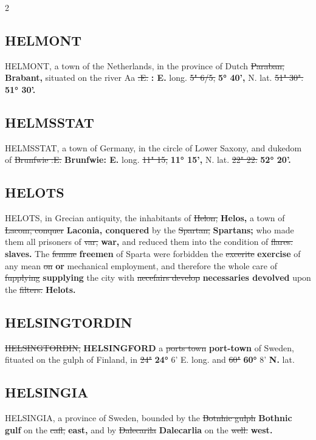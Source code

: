 \documentclass[10pt]{article}
\begin{document}
\begin{multicols}{2}
\subsection*{HELMONT}
HELMONT, a town of the Netherlands, in the province of Dutch \sout{Paraban,} \textbf{Brabant,} situated on the river Aa \sout{:E.} \textbf{: E.} long. \sout{5" 6/5,} \textbf{5° 40',} N. lat. \sout{51" 30".} \textbf{51° 30'.}

\subsection*{HELMSSTAT}
HELMSSTAT, a town of Germany, in the circle of Lower Saxony, and dukedom of \sout{Brunfwie :E.} \textbf{Brunfwie: E.} long. \sout{11" 15,} \textbf{11° 15',} N. lat. \sout{22" 22.} \textbf{52° 20'.}

\subsection*{HELOTS}
HELOTS, in Grecian antiquity, the inhabitants of \sout{Helon,} \textbf{Helos,} a town of \sout{Lacom, conquer} \textbf{Laconia, conquered} by the \sout{Spartan;} \textbf{Spartans;} who made them all prisoners of \sout{var,} \textbf{war,} and reduced them into the condition of \sout{flares.} \textbf{slaves.} The \sout{femme} \textbf{freemen} of Sparta were forbidden the \sout{excerite} \textbf{exercise} of any mean \sout{on} \textbf{or} mechanical employment, and therefore the whole care of \sout{fupplying} \textbf{supplying} the city with \sout{necefairs develop} \textbf{necessaries devolved} upon the \sout{filters.} \textbf{Helots.}

\subsection*{HELSINGTORDIN}
\sout{HELSINGTORDIN,} \textbf{HELSINGFORD} a \sout{ports town} \textbf{port-town} of Sweden, fituated on the gulph of Finland, in \sout{24"} \textbf{24°} 6' E. long. and \sout{60"} \textbf{60°} 8' \textbf{N.} lat.

\subsection*{HELSINGIA}
HELSINGIA, a province of Sweden, bounded by the \sout{Botnhic gulph} \textbf{Bothnic gulf} on the \sout{cafl,} \textbf{east,} and by \sout{Dalecarila} \textbf{Dalecarlia} on the \sout{well.} \textbf{west.}


\end{multicols}
\end{document}
